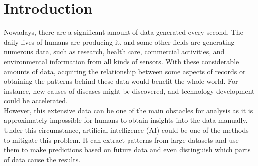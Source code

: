\documentclass[12pt,twoside]{report}
\date{June 2022}
\begin{document}



\clearpage{\pagestyle{empty}\cleardoublepage}
\setcounter{page}{1}
\pagestyle{plain}


\cleardoublepage

\clearpage{\pagestyle{empty}\cleardoublepage}

\tableofcontents 


\clearpage{\pagestyle{empty}\cleardoublepage}
\setcounter{page}{1}
\fancyhead[LE,RO]{\slshape \rightmark}
\fancyhead[LO,RE]{\slshape \leftmark}

\chapter{Introduction}

Nowadays, there are a significant amount of data generated every second. The daily lives of humans are producing it, and some other fields are generating numerous data, such as research, health care, commercial activities, and environmental information from all kinds of sensors. With these considerable amounts of data,  acquiring the relationship between some aspects of records or obtaining the patterns behind these data would benefit the whole world. For instance, new causes of diseases might be discovered, and technology development could be accelerated.
\\

However, this extensive data can be one of the main obstacles for analysis as it is approximately impossible for humans to obtain insights into the data manually. Under this circumstance, artificial intelligence (AI) could be one of the methods to mitigate this problem. It can extract patterns from large datasets and use them to make predictions based on future data and even distinguish which parts of data cause the results.
\\
\end{document}
